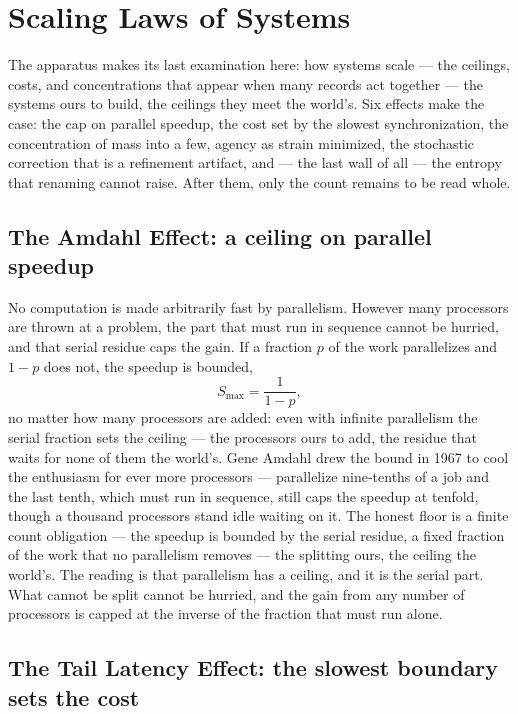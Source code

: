 \chapter{Scaling Laws of Systems}
\label{chap:scaling-laws-of-systems}

The apparatus makes its last examination here: how systems scale --- the ceilings, costs, and concentrations
that appear
when many records act together --- the systems ours to build, the ceilings they meet the world's. Six effects
make the case: the cap on parallel speedup, the cost set by the slowest
synchronization, the concentration of mass into a few, agency as strain minimized, the stochastic correction
that is a refinement artifact, and --- the last wall of all --- the entropy that renaming cannot raise. After
them, only the count remains to be read whole.

\section{The Amdahl Effect: a ceiling on parallel speedup}
\label{se:amdahl}

No computation is made arbitrarily fast by parallelism. However many processors are thrown at a problem, the
part that must run in sequence cannot be hurried, and that serial residue caps the gain. If a fraction $p$ of
the work parallelizes and $1 - p$ does not, the speedup is bounded,
\begin{equation}
  S_{\max} = \frac{1}{1 - p},
\end{equation}
no matter how many processors are added: even with infinite parallelism the serial fraction sets the ceiling
--- the processors ours to add, the residue that waits for none of them the world's.
Gene Amdahl drew the bound in 1967 to cool the enthusiasm for ever more processors --- parallelize
nine-tenths of a job and the last tenth, which must run in sequence, still caps the speedup at tenfold, though
a thousand processors stand idle waiting on it.
The honest floor is a finite count obligation --- the speedup is bounded by the serial residue, a fixed
fraction of the work that no parallelism removes --- the splitting ours, the ceiling the world's. The reading
is that parallelism has a ceiling, and it
is the serial part. What cannot be split cannot be hurried, and the gain from any number of processors
is capped at the inverse of the fraction that must run alone.

\section{The Tail Latency Effect: the slowest boundary sets the cost}
\label{se:tail-latency}


